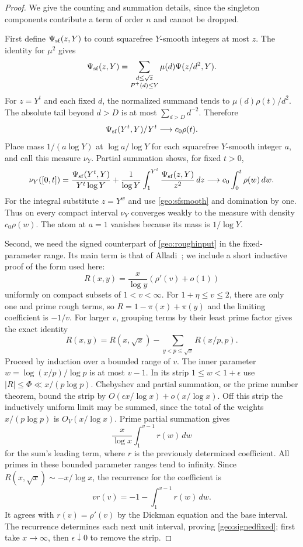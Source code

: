 \begin{proof}
We give the counting and summation details, since the singleton components contribute a term of order $n$ and cannot be dropped.

First define $\Psi_{\mathrm{sf}}(z,Y)$ to count squarefree $Y$-smooth integers at most $z$. The identity for $\mu^2$ gives
\[
 \Psi_{\mathrm{sf}}(z,Y)=\sum_{\substack{d\le\sqrt z\\P^+(d)\le Y}}
                         \mu(d)\Psi(z/d^2,Y).
\]
For $z=Y^t$ and each fixed $d$, the normalized summand tends to $\mu(d)\rho(t)/d^2$. The absolute tail beyond $d>D$ is at most $\sum_{d>D}d^{-2}$. Therefore
\begin{equation}\label{geo:sfsmooth}
 \Psi_{\mathrm{sf}}(Y^t,Y)/Y^t\longrightarrow c_0\rho(t).
\end{equation}
Place mass $1/(a\log Y)$ at $\log a/\log Y$ for each squarefree $Y$-smooth integer $a$, and call this measure $\nu_Y$. Partial summation shows, for fixed $t>0$,
\[
 \nu_Y([0,t])=
 \frac{\Psi_{\mathrm{sf}}(Y^t,Y)}{Y^t\log Y}
 +\frac1{\log Y}\int_1^{Y^t}\frac{\Psi_{\mathrm{sf}}(z,Y)}{z^2}\,dz
 \longrightarrow c_0\int_0^t\rho(w)\,dw.
\]
For the integral substitute $z=Y^w$ and use \eqref{geo:sfsmooth} and domination by one. Thus on every compact interval $\nu_Y$ converges weakly to the measure with density $c_0\rho(w)$. The atom at $a=1$ vanishes because its mass is $1/\log Y$.

Second, we need the signed counterpart of \eqref{geo:roughinput} in the fixed-parameter range. Its main term is that of Alladi~\cite[Theorem~1]{alladi1982}; we include a short inductive proof of the form used here:
\begin{equation}\label{geo:signedfixed}
 R(x,y)=\frac{x}{\log y}(\rho'(v)+o(1))
\end{equation}
uniformly on compact subsets of $1<v<\infty$. For $1+\eta\le v\le2$, there are only one and prime rough terms, so $R=1-\pi(x)+\pi(y)$ and the limiting coefficient is $-1/v$. For larger $v$, grouping terms by their least prime factor gives the exact identity
\[
 R(x,y)=R(x,\sqrt x)-\sum_{y<p\le\sqrt x}R(x/p,p).
\]
Proceed by induction over a bounded range of $v$. The inner parameter $w=\log(x/p)/\log p$ is at most $v-1$. In its strip $1\le w<1+\epsilon$ use $|R|\le\Phi\ll x/(p\log p)$. Chebyshev and partial summation, or the prime number theorem, bound the strip by $O(\epsilon x/\log x)+o(x/\log x)$. Off this strip the inductively uniform limit may be summed, since the total of the weights $x/(p\log p)$ is $O_V(x/\log x)$. Prime partial summation gives
\[
 \frac{x}{\log x}\int_1^{v-1}r(w)\,dw
\]
for the sum's leading term, where $r$ is the previously determined coefficient. All primes in these bounded parameter ranges tend to infinity. Since $R(x,\sqrt x)\sim-x/\log x$, the recurrence for the coefficient is
\[
 vr(v)=-1-\int_1^{v-1}r(w)\,dw.
\]
It agrees with $r(v)=\rho'(v)$ by the Dickman equation and the base interval. The recurrence determines each next unit interval, proving \eqref{geo:signedfixed}; first take $x\to\infty$, then $\epsilon\downarrow0$ to remove the strip.


\end{proof}
